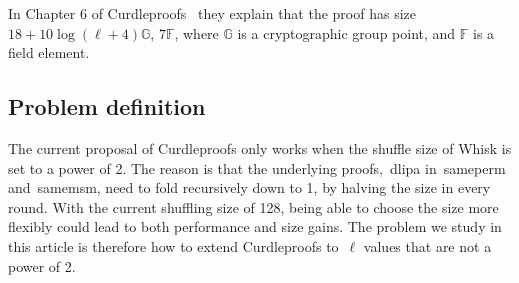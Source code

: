 In Chapter 6 of Curdleproofs~\cite{Curdleproofs} they explain that the proof has size~$18+10 \log(\ell+4)\mathbb{G}$, $7\mathbb{F}$, where $\mathbb{G}$ is a cryptographic group point, and $\mathbb{F}$ is a field element.

\subsection{Problem definition}\label{subsec:problem-definition}
The current proposal of Curdleproofs only works when the shuffle size of Whisk is set to a power of 2.
The reason is that the underlying proofs,~\gls{dlipa} in~\gls{sameperm} and~\gls{samemsm}, need to fold recursively down to 1, by halving the size in every round.
With the current shuffling size of 128, being able to choose the size more flexibly could lead to both performance and size gains.
The problem we study in this article is therefore how to extend Curdleproofs to~$\ell$ values that are not a power of 2.

